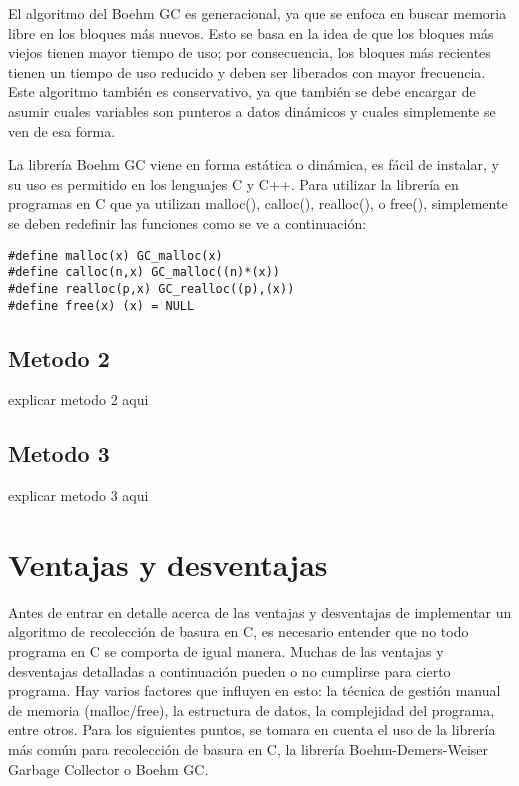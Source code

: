 \documentclass[11pt]{article} %
\begin{document}
	El algoritmo del Boehm GC es generacional, ya que se enfoca en buscar memoria libre en los bloques más nuevos. Esto se basa en la idea de que los bloques más viejos tienen mayor tiempo de uso; por consecuencia, los bloques más recientes tienen un tiempo de uso reducido y deben ser liberados con mayor frecuencia. Este algoritmo también es conservativo, ya que también se debe encargar de asumir cuales variables son punteros a datos dinámicos y cuales simplemente se ven de esa forma.

	La librería Boehm GC viene en forma estática o dinámica, es fácil de instalar, y su uso es permitido en los lenguajes C y C++. Para utilizar la librería en programas en C que ya utilizan malloc(), calloc(), realloc(), o free(), simplemente se deben redefinir las funciones como se ve a continuación:
\lstset{language=C}          %

\begin{lstlisting}[frame=single]  % Start your code-block
#define malloc(x) GC_malloc(x)
#define calloc(n,x) GC_malloc((n)*(x))
#define realloc(p,x) GC_realloc((p),(x))
#define free(x) (x) = NULL
\end{lstlisting}

\subsection{Metodo 2}
explicar metodo 2 aqui

\subsection{Metodo 3}
explicar metodo 3 aqui

\section{Ventajas y desventajas}
	Antes de entrar en detalle acerca de las ventajas y desventajas de implementar un algoritmo de recolección de basura en C, es necesario entender que no todo programa en C se comporta de igual manera. Muchas de las ventajas y desventajas detalladas a continuación pueden o no cumplirse para cierto programa. Hay varios factores que influyen en esto: la técnica de gestión manual de memoria (malloc/free), la estructura de datos, la complejidad del programa, entre otros.
	Para los siguientes puntos, se tomara en cuenta el uso de la librería más común para recolección de basura en C, la librería Boehm-Demers-Weiser Garbage Collector o Boehm GC.
\end{document}
